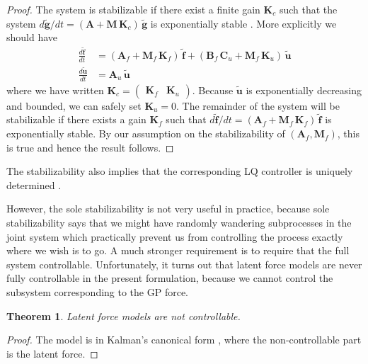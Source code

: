 \documentclass[journal]{IEEEtran}
\newtheorem{theorem}{Theorem}[section]
\newcommand{\simo}[1]{{\color{red}#1}}
\begin{document}
\begin{proof}
The system is stabilizable if there exist a finite gain $\mathbf{K}_c$ such that the system $d\tilde{\mathbf{g}}/dt = (\mathbf{A} + \mathbf{M} \, \mathbf{K}_c) \, \tilde{\mathbf{g}}$ is exponentially stable \cite{Wonham:1985}. More explicitly we should have
%
\begin{equation}
\begin{split}
  \frac{d\tilde{\mathbf{f}}}{dt} &= (\mathbf{A}_f + \mathbf{M}_f \, \mathbf{K}_f) \, \tilde{\mathbf{f}}
  + (\mathbf{B}_f \, \mathbf{C}_u + \mathbf{M}_f \, \mathbf{K}_u) \, \tilde{\mathbf{u}} \\
  \frac{d\tilde{\mathbf{u}}}{dt} &= \mathbf{A}_u \, \tilde{\mathbf{u}}
\end{split}
\end{equation}
%
where we have written $\mathbf{K}_c = \begin{pmatrix} \mathbf{K}_f & \mathbf{K}_u \end{pmatrix}$. Because $\tilde{\mathbf{u}}$ is exponentially decreasing and bounded, we can safely set $\mathbf{K}_u = 0$. The remainder of the system will be stabilizable if there exists a gain $\mathbf{K}_f$ such that $d\tilde{\mathbf{f}}/dt = (\mathbf{A}_f + \mathbf{M}_f \, \mathbf{K}_f) \, \tilde{\mathbf{f}}$ is exponentially stable. By our assumption on the stabilizability of $(\mathbf{A}_f,\mathbf{M}_f)$, this is true and hence the result follows.
\end{proof}

The stabilizability also implies that the corresponding LQ controller is uniquely determined \cite{Anderson+Moore:2007}.

However, the sole stabilizability is not very useful in practice, because sole stabilizability says that we might have randomly wandering subprocesses in the joint system which practically prevent us from controlling the process exactly where we wish is to go. A much stronger requirement is to require that the full system controllable. Unfortunately, it turns out that latent force models are never fully controllable in the present formulation, because we cannot control the subsystem corresponding to the GP force.

\begin{theorem}
  Latent force models are not controllable.
\end{theorem}

\begin{proof}
  The model is in Kalman's canonical form \cite{Kalman:1963}, where the non-controllable part is the latent force.
\end{proof}
\end{document}
